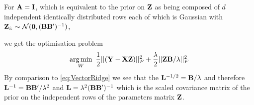 For $\mathbf{A}=\mathbf{I}$, which is equivalent to the prior on $\mathbf{Z}$ as being composed of $d$ independent identically distributed rows each of which is Gaussian with $\mathbf{Z}_{i:} \sim \mathcal{N}(\mathbf{0},(\mathbf{BB'})^{-1})$,

we get the optimisation problem
\begin{equation}
\operatorname*{arg\,min}_W \ \frac{1}{2} || (\mathbf{Y}-\mathbf{XZ})||_F^2 + \frac{\lambda}{2} ||\mathbf{ZB}/\lambda||_F^2
\end{equation}
By comparison to \eqref{eq:VectorRidge} we see that the $\mathbf{L}^{-1/2} = \mathbf{B}/\lambda$ and therefore $\mathbf{L}^{-1} = \mathbf{BB'}/\lambda^2$ and $\mathbf{L} = \lambda^2 (\mathbf{BB'})^{-1}$ which is the scaled covariance matrix of the prior on the independent rows of the parameters matrix $\mathbf{Z}$.
 











